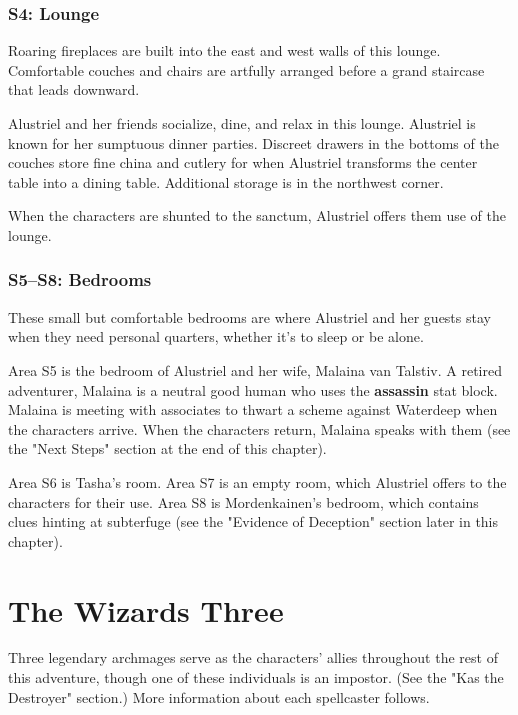 \documentclass[10pt,a4paper,twoside,bg=print,twocolumn,openany,nodeprecatedcode]{dndbook}
\begin{document}
\subsubsection{S4: Lounge}
\begin{DndReadAloud}{}
Roaring fireplaces are built into the east and west walls of this lounge. Comfortable couches and chairs are artfully arranged before a grand staircase that leads downward.

\end{DndReadAloud}

Alustriel and her friends socialize, dine, and relax in this lounge. Alustriel is known for her sumptuous dinner parties. Discreet drawers in the bottoms of the couches store fine china and cutlery for when Alustriel transforms the center table into a dining table. Additional storage is in the northwest corner.

When the characters are shunted to the sanctum, Alustriel offers them use of the lounge.

\subsubsection{S5–S8: Bedrooms}
These small but comfortable bedrooms are where Alustriel and her guests stay when they need personal quarters, whether it's to sleep or be alone.

Area S5 is the bedroom of Alustriel and her wife, Malaina van Talstiv. A retired adventurer, Malaina is a neutral good human who uses the \textbf{assassin} stat block. Malaina is meeting with associates to thwart a scheme against Waterdeep when the characters arrive. When the characters return, Malaina speaks with them (see the "Next Steps" section at the end of this chapter).

Area S6 is Tasha's room. Area S7 is an empty room, which Alustriel offers to the characters for their use. Area S8 is Mordenkainen's bedroom, which contains clues hinting at subterfuge (see the "Evidence of Deception" section later in this chapter).

\section{The Wizards Three}
Three legendary archmages serve as the characters' allies throughout the rest of this adventure, though one of these individuals is an impostor. (See the "Kas the Destroyer" section.) More information about each spellcaster follows.
\end{document}
